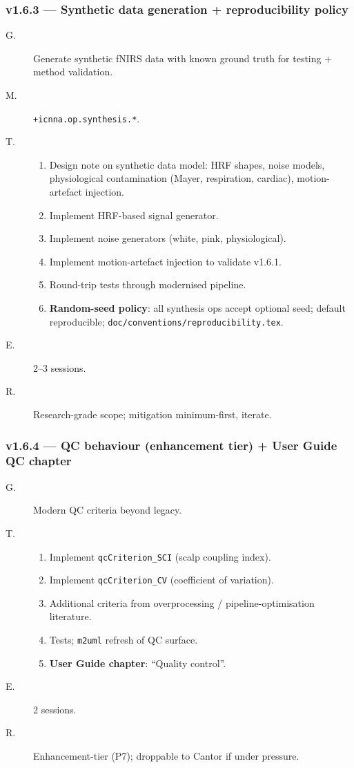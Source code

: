 \documentclass[11pt,a4paper]{article}
\begin{document}
\subsubsection*{v1.6.3 --- Synthetic data generation + reproducibility policy}

\begin{description}
    \item[G.] Generate synthetic fNIRS data with known ground truth for testing + method validation.
    \item[M.] \texttt{+icnna.op.synthesis.*}.
    \item[T.]
        \begin{enumerate}[nosep]
            \item Design note on synthetic data model: HRF shapes, noise models, physiological contamination (Mayer, respiration, cardiac), motion-artefact injection.
            \item Implement HRF-based signal generator.
            \item Implement noise generators (white, pink, physiological).
            \item Implement motion-artefact injection to validate v1.6.1.
            \item Round-trip tests through modernised pipeline.
            \item \textbf{Random-seed policy}: all synthesis ops accept optional seed; default reproducible; \texttt{doc/conventions/reproducibility.tex}.
        \end{enumerate}
    \item[E.] 2--3 sessions.
    \item[R.] Research-grade scope; mitigation minimum-first, iterate.
\end{description}

\subsubsection*{v1.6.4 --- QC behaviour (enhancement tier) + User Guide QC chapter}

\begin{description}
    \item[G.] Modern QC criteria beyond legacy.
    \item[T.]
        \begin{enumerate}[nosep]
            \item Implement \texttt{qcCriterion\_SCI} (scalp coupling index).
            \item Implement \texttt{qcCriterion\_CV} (coefficient of variation).
            \item Additional criteria from overprocessing / pipeline-optimisation literature.
            \item Tests; \texttt{m2uml} refresh of QC surface.
            \item \textbf{User Guide chapter}: ``Quality control''.
        \end{enumerate}
    \item[E.] 2 sessions.
    \item[R.] Enhancement-tier (P7); droppable to Cantor if under pressure.
\end{description}
\end{document}
